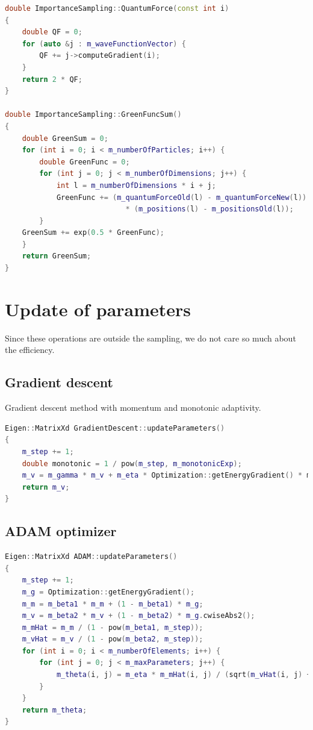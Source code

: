 \begin{lstlisting}[language=c++,caption={Taken from \lstinline{importancesampling.cpp}.}]
double ImportanceSampling::QuantumForce(const int i)
{
	double QF = 0;
	for (auto &j : m_waveFunctionVector) {
		QF += j->computeGradient(i);
	}
	return 2 * QF;
}

double ImportanceSampling::GreenFuncSum()
{
	double GreenSum = 0;
	for (int i = 0; i < m_numberOfParticles; i++) {
		double GreenFunc = 0;
		for (int j = 0; j < m_numberOfDimensions; j++) {
			int l = m_numberOfDimensions * i + j;
			GreenFunc += (m_quantumForceOld(l) - m_quantumForceNew(l))
							* (m_positions(l) - m_positionsOld(l));
		}
	GreenSum += exp(0.5 * GreenFunc);
	}
	return GreenSum;
}
\end{lstlisting}

\section{Update of parameters} \label{sec:update}
Since these operations are outside the sampling, we do not care so much about the efficiency. 

\subsection{Gradient descent}
Gradient descent method with momentum and monotonic adaptivity.
\begin{lstlisting}[language=c++,caption={Taken from \lstinline{gradientdescent.cpp}.}]
Eigen::MatrixXd GradientDescent::updateParameters()
{
	m_step += 1;
	double monotonic = 1 / pow(m_step, m_monotonicExp);
	m_v = m_gamma * m_v + m_eta * Optimization::getEnergyGradient() * monotonic;
	return m_v;
}
\end{lstlisting}

\subsection{ADAM optimizer}
\begin{lstlisting}[language=c++,caption={Taken from \lstinline{adam.cpp}.}]
Eigen::MatrixXd ADAM::updateParameters()
{
	m_step += 1;
	m_g = Optimization::getEnergyGradient();
	m_m = m_beta1 * m_m + (1 - m_beta1) * m_g;
	m_v = m_beta2 * m_v + (1 - m_beta2) * m_g.cwiseAbs2();
	m_mHat = m_m / (1 - pow(m_beta1, m_step));
	m_vHat = m_v / (1 - pow(m_beta2, m_step));
	for (int i = 0; i < m_numberOfElements; i++) {
		for (int j = 0; j < m_maxParameters; j++) {
			m_theta(i, j) = m_eta * m_mHat(i, j) / (sqrt(m_vHat(i, j) + m_epsilon));
		}
	}
	return m_theta;
}
\end{lstlisting}